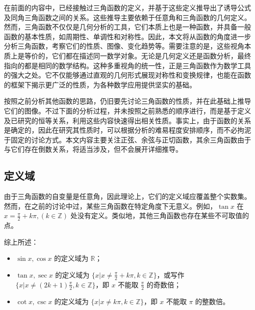 
\begin{issues}
\issueDraft
\end{issues}


在前面的内容中，已经接触过三角函数的定义，并基于这些定义推导出了诱导公式及同角三角函数之间的关系。这些推导主要依赖于任意角和三角函数的几何定义。然而，三角函数不仅仅是几何分析的工具，它们本质上也是一种函数，并具备一般函数的基本性质，如周期性、单调性和对称性。因此，本文将从函数的角度进一步分析三角函数，考察它们的性质、图像、变化趋势等。需要注意的是，这些视角本质上是等价的，它们都在描述同一数学对象。无论是几何定义还是函数分析，最终指向的都是相同的数学结构。这种多重视角的统一性，正是三角函数作为数学工具的强大之处。它不仅能够通过直观的几何形式展现对称性和变换规律，也能在函数的框架下揭示更广泛的性质，为各种数学应用提供坚实的基础。

按照之前分析其他函数的思路，仍旧要先讨论三角函数的性质，并在此基础上推导它们的图像。不过下面的分析过程，并未按照之前熟悉的顺序进行，而是基于定义及已研究的恒等关系，利用这些内容快速得出相关性质。事实上，由于函数的关系是确定的，因此在研究其性质时，可以根据分析的难易程度安排顺序，而不必拘泥于固定的讨论方式。本文内容主要关注正弦、余弦与正切函数，其余三角函数由于与它们存在倒数关系，将适当涉及，但不会展开详细推导。

\subsection{定义域}

由于三角函数的自变量是任意角，因此理论上，它们的定义域应覆盖整个实数集。然而，在之前的讨论中过，某些三角函数在特定角度下无意义。例如，$\tan x$ 在 $\displaystyle x=\frac{\pi}{2}+k\pi, (k\in\mathbb{Z})$ 处没有定义。类似地，其他三角函数也存在某些不可取值的点。

综上所述：
\begin{itemize}
\item $\sin x,\cos x$ 的定义域为 $\mathbb{R}$；
\item $\tan x,\sec x$ 的定义域为 $\displaystyle\{x|x\neq\frac{\pi}{2}+k\pi,k\in\mathbb{Z}\}$，或写作$\displaystyle\{x|x\neq(2k+1)\frac{\pi}{2},k\in\mathbb{Z}\}$，即 $x$ 不能取 $\displaystyle\frac{\pi}{2}$ 的奇数倍；
\item $\cot x,\csc x$ 的定义域为 $\displaystyle\{x|x\neq k\pi,k\in\mathbb{Z}\}$，即 $x$ 不能取 $\pi$ 的整数倍。
\end{itemize}

